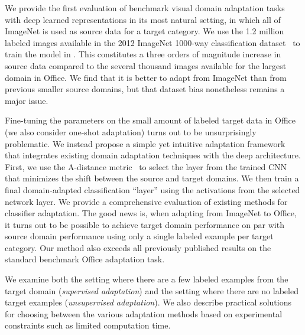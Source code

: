 
We provide the first evaluation of benchmark visual domain adaptation tasks with
deep learned representations in its most natural setting, in which all of
ImageNet is used as source data for a target category.  We use the 1.2 million
labeled images available in the 2012 ImageNet 1000-way classification
dataset~\cite{ilsvrc2012} to train the model in \cite{supervision}. This
constitutes a three orders of magnitude increase in source data compared to the
several thousand images available for the largest domain in Office.  We find
that it is better to adapt from ImageNet than from previous smaller source
domains, but that dataset bias nonetheless remains a major issue.

Fine-tuning the parameters on the small amount of labeled target data in Office
(we also consider one-shot adaptation) turns out to be unsurprisingly
problematic. We instead propose a simple yet intuitive adaptation framework that
integrates existing domain adaptation techniques with the deep architecture.
First, we use the A-distance metric~\cite{adist} to select the layer from the
trained CNN that minimizes the shift between the source and target domains.  We
then train a final domain-adapted classification ``layer'' using the activations
from the selected network layer.  We provide a comprehensive evaluation of
existing methods for classifier adaptation.  The good news is, when adapting
from ImageNet to Office, it turns out to be possible to achieve target domain
performance on par with source domain performance using only a single labeled
example per target category.  Our method also exceeds all previously published
results on the standard benchmark Office adaptation task.

We examine both the setting where there are a few labeled examples from the target domain (\emph{supervised adaptation}) and the setting where there are no labeled target examples (\emph{unsupervised adaptation}). We also describe practical solutions for choosing between the various adaptation methods based on experimental constraints such as limited computation time. 

